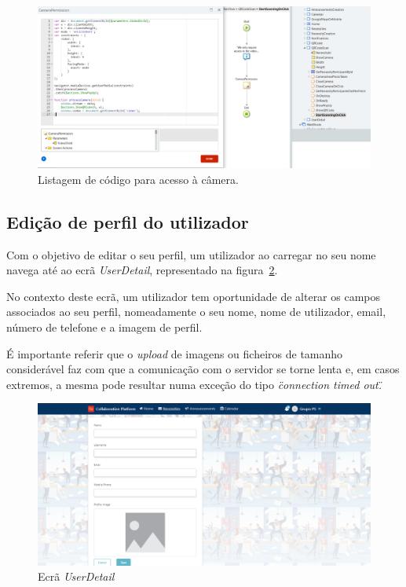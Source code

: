 \begin{figure}[H]
  \centering 
  \includegraphics[scale=0.4]{figures/CameraCode.png}
  \caption{Listagem de código para acesso à câmera.}\label{fig:cameraCode}
\end{figure}

\newpage


\subsection{Edição de perfil do utilizador}\label{subsec:implementacao:editprofile}

Com o objetivo de editar o seu perfil, um utilizador ao carregar no seu nome navega até ao ecrã \textit{UserDetail}, representado na figura~\ref{fig:user_detail}. 
\par
No contexto deste ecrã, um utilizador tem oportunidade de alterar os campos associados ao seu perfil, nomeadamente o seu nome, nome de utilizador, email, número de telefone e a imagem de perfil.
\par 
É importante referir que o \textit{upload} de imagens ou ficheiros de tamanho considerável faz com que a comunicação com o servidor se torne lenta e, em casos extremos, a mesma pode resultar numa exceção do tipo \textit{\" connection timed out\".}
 
\begin{figure}[H]
  \centering 
  \includegraphics[scale=0.4]{figures/user_detail.png}
  \caption{Ecrã \textit{UserDetail} }\label{fig:user_detail}
\end{figure}



